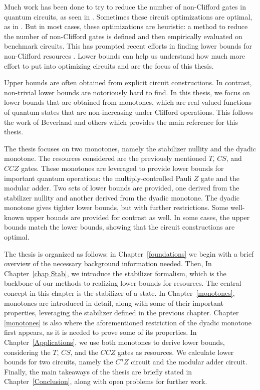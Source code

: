 \documentclass[12pt]{dalthesis}
\begin{document}
Much work has been done to try to reduce the number of non-Clifford gates in quantum circuits, as seen in \cite{ross2016optimal, selinger2014efficient, Amy_2019, glaudell2021optimal, haner2018optimizing, amy2021phasestate, gosset2013algorithm}. Sometimes these circuit optimizations are optimal, as in \cite{ross2016optimal, glaudell2021optimal, gosset2013algorithm}. But in most cases, these optimizations are heuristic: a method to reduce the number of non-Clifford gates is defined and then empirically evaluated on benchmark circuits. This has prompted recent efforts in finding lower bounds for non-Clifford resources \cite{beverland2019lower, Wang_2019, meuli2019role}. Lower bounds can help us understand how much more effort to put into optimizing circuits and are the focus of this thesis. 

Upper bounds are often obtained from explicit circuit constructions. In contrast, non-trivial lower bounds are notoriously hard to find. In this thesis, we focus on lower bounds that are obtained from monotones, which are real-valued functions of quantum states that are non-increasing under Clifford operations. This follows the work of Beverland and others \cite{beverland2019lower} which provides the main reference for this thesis. 

The thesis focuses on two monotones, namely the stabilizer nullity and the dyadic monotone. The resources considered are the previously mentioned $T$, $CS$, and $CCZ$ gates. These monotones are leveraged to provide lower bounds for important quantum operations: the multiply-controlled Pauli $Z$ gate and the modular adder. Two sets of lower bounds are provided, one derived from the stabilizer nullity and another derived from the dyadic monotone. The dyadic monotone gives tighter lower bounds, but with further restrictions. Some well-known upper bounds are provided for contrast as well. In some cases, the upper bounds match the lower bounds, showing that the circuit constructions are optimal. 

The thesis is organized as follows: in Chapter~\ref{foundations} we begin with a brief overview of the necessary background information needed. Then, In Chapter~\ref{chap Stab}, we introduce the stabilizer formalism, which is the backbone of our methods to realizing lower bounds for resources. The central concept in this chapter is the stabilizer of a state. In Chapter~\ref{monotones}, monotones are introduced in detail, along with some of their important properties, leveraging the stabilizer defined in the previous chapter. Chapter \ref{monotones} is also where the aforementioned restriction of the dyadic monotone first appears, as it is needed to prove some of its properties. In Chapter~\ref{Applications}, we use both monotones to derive lower bounds, considering the $T$, $CS$, and the $CCZ$ gates as resources. We calculate lower bounds for two circuits, namely the $C^nZ$ circuit and the modular adder circuit. Finally, the main takeaways of the thesis are briefly stated in Chapter~\ref{Conclusion}, along with open problems for further work.
\end{document}
